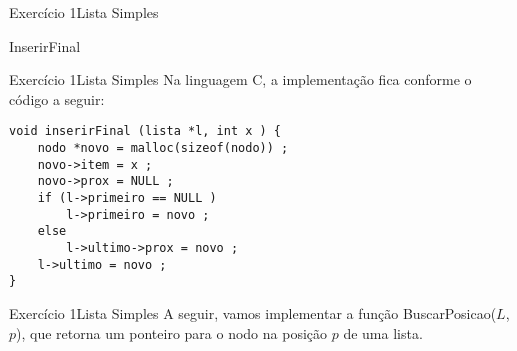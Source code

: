 \documentclass[aspectratio=169]{beamer}
\begin{document}

\begin{frame}[fragile]{Exercício 1}{Lista Simples}
\begin{algorithm}[H]
\caption{InserirFinal} 
\label{ListaSimplesInserirFinal}
\end{algorithm}
\end{frame}


\begin{frame}[fragile]{Exercício 1}{Lista Simples}
Na linguagem C, a implementação fica conforme o código a seguir:
\begin{lstlisting}[style=CStyle]
void inserirFinal (lista *l, int x ) {
    nodo *novo = malloc(sizeof(nodo)) ;
    novo->item = x ;
    novo->prox = NULL ;
    if (l->primeiro == NULL ) 
        l->primeiro = novo ;
    else 
        l->ultimo->prox = novo ;    
    l->ultimo = novo ;
}
\end{lstlisting}  
\end{frame}


\begin{frame}[fragile]{Exercício 1}{Lista Simples}
A seguir, vamos implementar a função BuscarPosicao($L$, $p$), que retorna um ponteiro para o nodo na posição $p$ de uma lista.
\end{frame}

\end{document}
